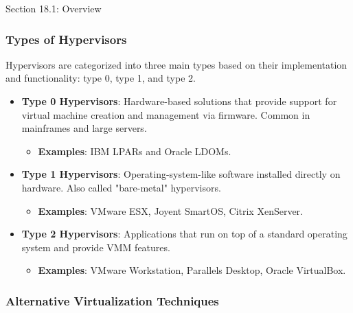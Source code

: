 \begin{notes}{Section 18.1: Overview}
\begin{highlight}
    \end{highlight}
    
    \subsubsection*{Types of Hypervisors}
    
    Hypervisors are categorized into three main types based on their implementation and functionality: type 0, type 1, and type 2.
    
    \begin{highlight}
    
        \begin{itemize}
            \item \textbf{Type 0 Hypervisors}: Hardware-based solutions that provide support for virtual machine creation and management via firmware. Common in mainframes and large servers.
                \begin{itemize}
                    \item \textbf{Examples}: IBM LPARs and Oracle LDOMs.
                \end{itemize}
            \item \textbf{Type 1 Hypervisors}: Operating-system-like software installed directly on hardware. Also called "bare-metal" hypervisors.
                \begin{itemize}
                    \item \textbf{Examples}: VMware ESX, Joyent SmartOS, Citrix XenServer.
                \end{itemize}
            \item \textbf{Type 2 Hypervisors}: Applications that run on top of a standard operating system and provide VMM features.
                \begin{itemize}
                    \item \textbf{Examples}: VMware Workstation, Parallels Desktop, Oracle VirtualBox.
                \end{itemize}
        \end{itemize}
    
    \end{highlight}
    
    \subsubsection*{Alternative Virtualization Techniques}
    

\end{notes}
